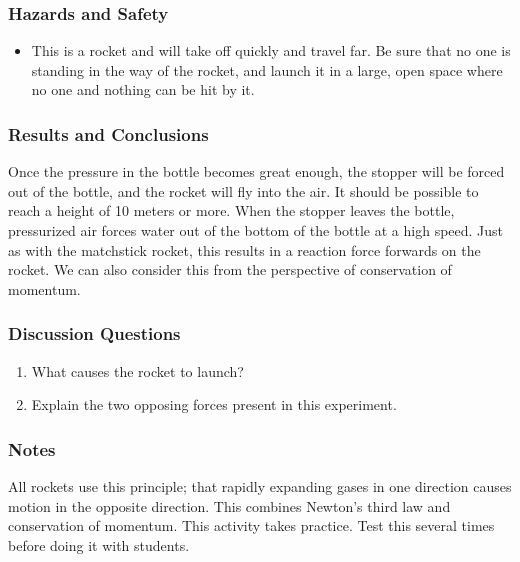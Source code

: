 \subsubsection*{Hazards and Safety}
\begin{itemize}
\item{This is a rocket and will take off quickly and travel far.  Be sure that no one is standing in the way of the rocket, and launch it in a large, open space where no one and nothing can be hit by it.}
\end{itemize}

\subsubsection*{Results and Conclusions}
Once the pressure in the bottle becomes great enough, the stopper will be forced out of the bottle, and the rocket will fly into the air. It should be possible to reach a height of 10 meters or more.  When the stopper leaves the bottle, pressurized air forces water out of the bottom of the bottle at a high speed. Just as with the matchstick rocket, this results in a reaction force forwards on the rocket.
We can also consider this from the perspective of conservation of momentum.


\subsubsection*{Discussion Questions}
\begin{enumerate}
\item{What causes the rocket to launch?}
\item{Explain the two opposing forces present in this experiment.}
\end{enumerate}

\subsubsection*{Notes}
All rockets use this principle; that rapidly expanding gases in one direction causes motion in the opposite direction.  This combines Newton's third law and conservation of momentum.
This activity takes practice. Test this several times before doing it with students.



